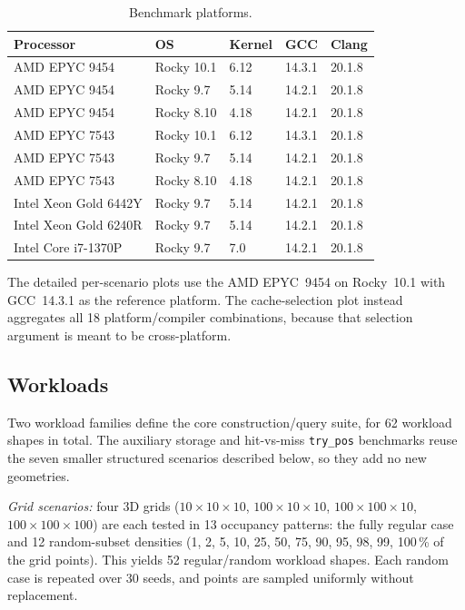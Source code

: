 \documentclass[manuscript,screen,review]{acmart}
\theoremstyle{definition}
\theoremstyle{plain}
\begin{document}
\begin{table}[ht]
\centering
\caption{Benchmark platforms.}
\label{table:platforms}
\begin{tabular}{lllll}
\toprule
Processor & OS & Kernel & GCC & Clang \\
\midrule
AMD EPYC 9454
  & Rocky 10.1 & 6.12
  & 14.3.1 & 20.1.8 \\
AMD EPYC 9454
  & Rocky 9.7 & 5.14
  & 14.2.1 & 20.1.8 \\
AMD EPYC 9454
  & Rocky 8.10 & 4.18
  & 14.2.1 & 20.1.8 \\
AMD EPYC 7543
  & Rocky 10.1 & 6.12
  & 14.3.1 & 20.1.8 \\
AMD EPYC 7543
  & Rocky 9.7 & 5.14
  & 14.2.1 & 20.1.8 \\
AMD EPYC 7543
  & Rocky 8.10 & 4.18
  & 14.2.1 & 20.1.8 \\
Intel Xeon Gold 6442Y
  & Rocky 9.7 & 5.14
  & 14.2.1 & 20.1.8 \\
Intel Xeon Gold 6240R
  & Rocky 9.7 & 5.14
  & 14.2.1 & 20.1.8 \\
Intel Core i7-1370P
  & Rocky 9.7 & 7.0
  & 14.2.1 & 20.1.8 \\
\bottomrule
\end{tabular}
\end{table}

The detailed per-scenario plots use the AMD EPYC~9454 on Rocky~10.1 with
GCC~14.3.1 as the reference platform.
The cache-selection plot instead aggregates all 18 platform/compiler
combinations, because that selection argument is meant to be
cross-platform.

\subsection{Workloads}
\label{section:workloads}

Two workload families define the core construction/query suite, for 62
workload shapes in total. The auxiliary storage and hit-vs-miss
\texttt{try\_pos} benchmarks reuse the seven smaller structured
scenarios described below, so they add no new geometries.

\emph{Grid scenarios:}
four 3D grids ($10{\times}10{\times}10$, $100{\times}10{\times}10$,
$100{\times}100{\times}10$, $100{\times}100{\times}100$) are each tested
in 13 occupancy patterns: the fully regular case and 12 random-subset
densities (1, 2, 5, 10, 25, 50, 75, 90, 95, 98, 99, 100\,\% of the grid
points).
This yields 52 regular/random workload shapes.
Each random case is repeated over 30 seeds, and points are sampled
uniformly without replacement.
\end{document}
